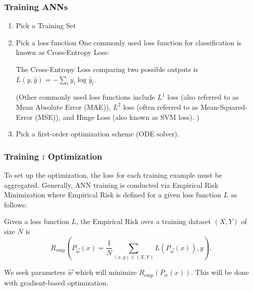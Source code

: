 \begin{frame}
  \frametitle{Training ANNs}
  \begin{enumerate}
  \item Pick a Training Set
  \item Pick a loss function
     One commonly used loss function for classification is known as Cross-Entropy Loss:
 \begin{definition}{The Cross-Entropy Loss comparing two possible outputs is}
 $L(y,\hat y) = -\sum_i y_i \log \hat y_i$.
 \end{definition}
(Other commonly used loss functions include $L^1$ loss (also referred
to as Mean Absolute Error (MAE)), $L^2$ loss (often referred to as
Mean-Squared-Error (MSE)), and Hinge Loss (also known as SVM loss). )
\item Pick a first-order optimization scheme (ODE solver).
  \end{enumerate}
\end{frame}



\begin{frame}
  \frametitle{Training : Optimization}
  
 To set up the optimization, the loss for each training example must be aggregated. Generally, ANN training is conducted via Empirical Risk Minimization where Empirical Risk is defined for a given loss function $L$ as follows:
 \begin{definition}{Given a loss function $L$, the Empirical Risk over a training dataset $(X,Y)$ of size $N$ is }
 \[R_{\text{emp}}(P_{\vec w}(x) = \dfrac{1}{N} \sum_{(x,y) \in (X,Y)} L(P_{\vec w}(x)), y).\]
 \end{definition}
 We seek parameters $\vec w$ which will minimize $R_{\text{emp}}(P_{w}(x))$. This will be done with gradient-based optimization. 
\end{frame}


